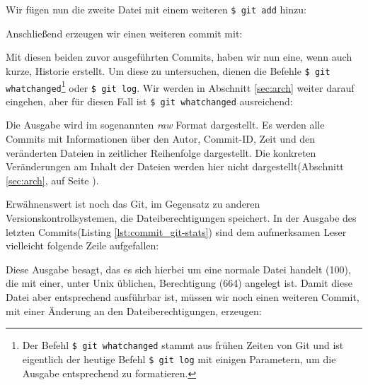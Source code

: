 Wir fügen nun die zweite Datei mit einem weiteren \texttt{\$ git add} hinzu:



Anschließend erzeugen wir einen weiteren \gls{commit} mit:



Mit diesen beiden zuvor ausgeführten Commits, haben wir nun eine, wenn auch
kurze, Historie erstellt. Um diese zu untersuchen, dienen die Befehle
\texttt{\$ git whatchanged}\footnote{Der Befehl \texttt{\$ git whatchanged}
stammt aus frühen Zeiten von Git und ist eigentlich der heutige Befehl
\texttt{\$ git log} mit einigen Parametern, um die Ausgabe entsprechend zu
formatieren.} oder \texttt{\$ git log}. Wir werden in Abschnitt \ref{sec:arch}
weiter darauf eingehen, aber für diesen Fall ist \texttt{\$ git whatchanged}
ausreichend:



Die Ausgabe wird im sogenannten \textit{raw} Format dargestellt. Es werden alle
Commits mit Informationen über den Autor, Commit-ID, Zeit und den veränderten
Dateien in zeitlicher Reihenfolge dargestellt. Die konkreten Veränderungen am
Inhalt der Dateien werden hier nicht dargestellt(Abschnitt \ref{sec:arch}, auf
Seite \pageref{sec:arch}).

Erwähnenswert ist noch das Git, im Gegensatz zu anderen
Versionskontrollsystemen, die Dateiberechtigungen speichert. In der Ausgabe des
letzten Commits(Listing \ref{lst:commit_git-stats}) sind dem aufmerksamen
Leser vielleicht folgende Zeile aufgefallen:



Diese Ausgabe besagt, das es sich hierbei um eine normale Datei handelt (100),
die mit einer, unter Unix üblichen, Berechtigung (664) angelegt ist. Damit
diese Datei aber entsprechend ausführbar ist, müssen wir noch einen weiteren
Commit, mit einer Änderung an den Dateiberechtigungen, erzeugen:



